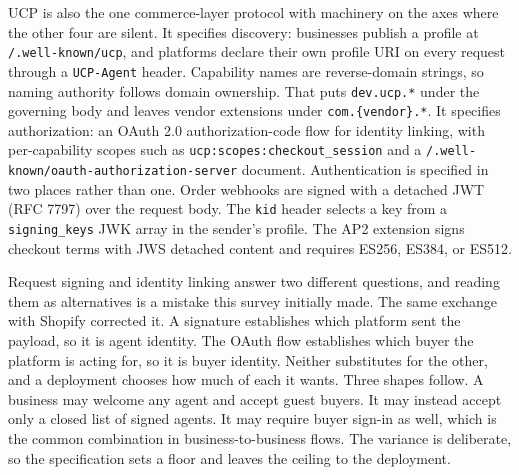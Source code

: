 UCP is also the one commerce-layer protocol with
machinery on the axes where the other four are silent. It
specifies discovery: businesses publish a profile at
\texttt{/.well-known/ucp}, and platforms declare their own
profile URI on every request through a \texttt{UCP-Agent}
header. Capability names are reverse-domain strings, so
naming authority follows domain ownership. That puts
\texttt{dev.ucp.*} under the governing body and leaves
vendor extensions under \texttt{com.\{vendor\}.*}. It
specifies authorization: an OAuth 2.0 authorization-code
flow for identity linking, with per-capability scopes such
as \texttt{ucp:scopes:checkout\_session} and a
\texttt{/.well-known/oauth-authorization-server} document.
Authentication is specified in two places rather than one.
Order webhooks are signed with a detached JWT (RFC 7797)
over the request body. The \texttt{kid} header selects a key
from a \texttt{signing\_keys} JWK array in the sender's
profile.
The AP2 extension signs checkout terms with JWS detached
content and requires ES256, ES384, or ES512.

Request signing and identity linking answer two different
questions, and reading them as alternatives is a mistake this
survey initially made. The same exchange with Shopify
corrected it. A signature establishes which
platform sent the payload, so it is agent identity. The OAuth
flow establishes which buyer the platform is acting for, so it
is buyer identity. Neither substitutes for the other, and a
deployment chooses how much of each it wants. Three shapes
follow. A business may welcome any agent and accept guest
buyers. It may instead accept only a closed list of signed
agents. It may require buyer sign-in as well, which is the
common combination in business-to-business flows. The variance
is deliberate, so the specification sets a floor and leaves the
ceiling to the deployment.

